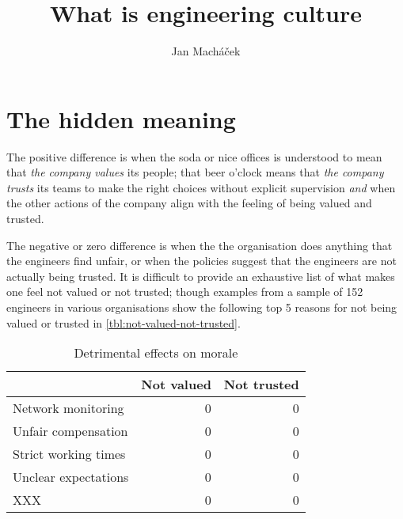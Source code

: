 



\title{What is engineering culture}

\author{Jan Macháček}




\section{The hidden meaning}


The positive difference is when the soda or nice offices is understood to mean that \emph{the company values} its people; that beer o'clock means that \emph{the company trusts} its teams to make the right choices without explicit supervision \emph{and} when the other actions of the company align with the feeling of being valued and trusted\cite{joel-on-software}.

The negative or zero difference is when the the organisation does anything that the engineers find unfair, or when the policies suggest that the engineers are not actually being trusted. It is difficult to provide an exhaustive list of what makes one feel not valued or not trusted; though examples from a sample of 152 engineers in various organisations show the following top 5 reasons for not being valued or trusted in \autoref{tbl:not-valued-not-trusted}.

\begin{table}[h]
    \begin{tabular}{lrr}
        \toprule
                             & Not valued & Not trusted \\
        \midrule
        Network monitoring   & 0          & 0 \\
        Unfair compensation  & 0          & 0 \\
        Strict working times & 0          & 0 \\
        Unclear expectations & 0          & 0 \\
        XXX                  & 0          & 0 \\         
        \bottomrule
    \end{tabular}
    \caption{Detrimental effects on morale}
    \label{tbl:not-valued-not-trusted}
\end{table}


\printbibliography

